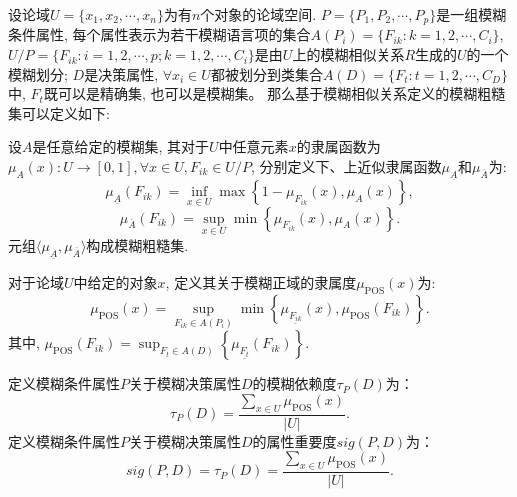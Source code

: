 设论域$U=\{x_1,x_2,\cdots,x_n\}$为有$n$个对象的论域空间. $P=\{P_1,P_2,\cdots,P_p\}$是一组模糊条件属性, 每个属性表示为若干模糊语言项的集合$A(P_i)=\{F_{ik}:k=1,2,\cdots,C_i\}$, $U/P=\{F_{ik}:i=1,2,\cdots,p;k=1,2,\cdots,C_i\}$是由$U$上的模糊相似关系$R$生成的$U$的一个模糊划分; $D$是决策属性, $\forall x_i \in U$都被划分到类集合$A(D)=\{F_t:t=1,2,\cdots,C_D\}$中, $F_t$既可以是精确集, 也可以是模糊集\cite{基于粗糙集和模糊粗糙集的属性约简研究}。 那么基于模糊相似关系定义的模糊粗糙集可以定义如下:
\begin{Definition}[基于模糊相似关系的模糊粗糙集]\cite{基于粗糙集和模糊粗糙集的属性约简研究}
    设$A$是任意给定的模糊集, 其对于$U$中任意元素$x$的隶属函数为$\mu_{A}(x): U \rightarrow[0,1],\forall x \in U,F_{ik}\in U/P$, 分别定义下、上近似隶属函数$\mu_{\underline{A}}$和$\mu_{\overline{A}}$为:
$$\mu_{\underline{A}}\left(F_{i k}\right)=\inf _{x \in U} \max \left\{1-\mu_{F_{i k}}(x), \mu_{A}(x)\right\},$$
$$\mu_{\overline{A}}\left(F_{i k}\right)=\sup _{x \in U} \min \left\{\mu_{F_{i k}}(x), \mu_{A}(x)\right\}.$$
元组$\langle\mu_{\underline{A}}, \mu_{\overline{A}}\rangle$构成模糊粗糙集.
\end{Definition}
\begin{Definition}[模糊正域隶属度]\cite{基于粗糙集和模糊粗糙集的属性约简研究}
  \label{def:模糊正域隶属度}
对于论域$U$中给定的对象$x$, 定义其关于模糊正域的隶属度$\mu_{\operatorname{POS}}(x)$为:
$$\mu_{\operatorname{POS}}(x)=\sup _{F_{i k} \in A\left(P_{i}\right)} \min \left\{\mu_{\underline{F_{i k}}}(x), \mu_{\operatorname{POS}}(F_{i k})\right\}.$$
其中, $\mu_{\operatorname{POS}}(F_{i k})=\sup _{F_{t} \in A(D)}\left\{\mu_{\underline{F_{t}}}\left(F_{i k}\right)\right\}.$
    \end{Definition}
\begin{Definition}[模糊依赖度与属性重要度]\cite{基于粗糙集和模糊粗糙集的属性约简研究}
  \label{def:模糊依赖度}
    定义模糊条件属性$P$关于模糊决策属性$D$的模糊依赖度$\tau_{P}(D)$为：
    $$\tau_{P}(D)=\frac{\sum_{x \in U} \mu_{\operatorname{POS}}(x)}{|U|}.$$
    定义模糊条件属性$P$关于模糊决策属性$D$的属性重要度$sig(P,D)$为：
        $$sig(P,D)=\tau_{P}(D)=\frac{\sum_{x \in U} \mu_{\operatorname{POS}}(x)}{|U|}.$$
\end{Definition}

